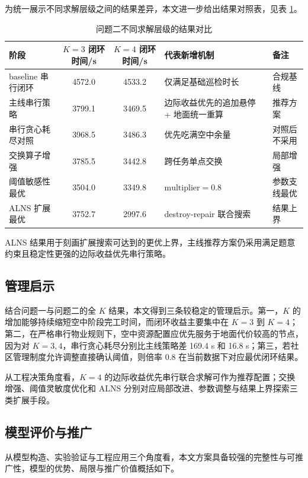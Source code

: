\documentclass[12pt]{article}
\begin{document}
为统一展示不同求解层级之间的结果差异，本文进一步给出结果对照表，见表 \ref{tab:problem2-full-journey-rewrite}。

\begin{table}[H]
\centering
\caption{问题二不同求解层级的结果对比}
\label{tab:problem2-full-journey-rewrite}
\small
\setlength{\tabcolsep}{4pt}
\begin{tabularx}{\linewidth}{>{\raggedright\arraybackslash}p{2.5cm}cc>{\raggedright\arraybackslash}X>{\raggedright\arraybackslash}p{2.8cm}}
\toprule
阶段 & $K=3$ 闭环时间/s & $K=4$ 闭环时间/s & 代表新增机制 & 备注 \\
\midrule
baseline 串行闭环 & 4572.0 & 4533.2 & 仅满足基础巡检时长 & 合规基线 \\
主线串行策略 & 3799.1 & 3469.5 & 边际收益优先的追加悬停 + 地面统一重算 & 推荐方案 \\
串行贪心耗尽对照 & 3968.5 & 3486.3 & 优先吃满空中余量 & 对照后不采用 \\
交换算子增强 & 3785.5 & 3442.8 & 跨任务单点交换 & 局部增强 \\
阈值敏感性最优 & 3504.0 & 3349.8 & $\text{multiplier}=0.8$ & 参数支线最优 \\
ALNS 扩展最优 & 3752.7 & 2997.6 & destroy-repair 联合搜索 & 结果上界 \\
\bottomrule
\end{tabularx}
\normalsize
\end{table}

ALNS 结果用于刻画扩展搜索可达到的更优上界，主线推荐方案仍采用满足题意约束且稳定性更强的边际收益优先串行策略。

\subsection{管理启示}
结合问题一与问题二的全 $K$ 结果，本文得到三条较稳定的管理启示。第一，$K$ 的增加能够持续缩短空中阶段完工时间，而闭环收益主要集中在 $K=3$ 到 $K=4$；第二，在严格串行物业规则下，空中资源配置应优先服务于地面代价较高的节点，因为对 $K=3,4$，串行贪心耗尽分别比主线策略差 169.4 s 和 16.8 s；第三，若社区管理制度允许调整直接确认阈值，则倍率 $0.8$ 在当前数据下对应最优闭环结果。

从工程决策角度看，$K=4$ 的边际收益优先串行联合求解可作为推荐配置；交换增强、阈值灵敏度优化和 ALNS 分别对应局部改进、参数调整与结果上界探索三类扩展手段。

\subsection{模型评价与推广}
从模型构造、实验验证与工程应用三个角度看，本文方案具备较强的完整性与可推广性，模型的优势、局限与推广价值概括如下。
\end{document}
